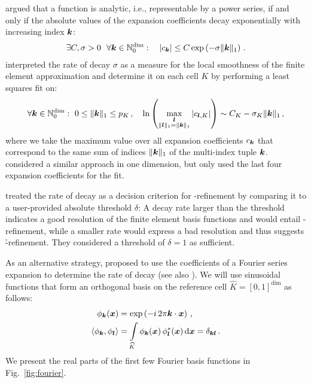 \textcite[Prop.~2]{eibner2007} argued that a function is analytic, i.e., representable by a power series, if and only if the absolute values of the expansion coefficients decay exponentially with increasing index $\tuple{k}$:
\begin{align}
\exists C,\sigma > 0 ~~ \forall \tuple{k} \in \mathbb{N}_0^\text{dim} : \quad |c_\tuple{k}| \leq C \exp\left( - \sigma \|\tuple{k}\|_1\right) \,\text{.}
\end{align}
\textcites[Sec.~2.4]{houston2005}[Ch.~4]{eibner2007} interpreted the rate of decay $\sigma$ as a measure for the local smoothness of the finite element approximation and determine it on each cell $K$ by performing a least squares fit on:
\begin{align}
\forall \tuple{k} \in \mathbb{N}_0^\text{dim} : ~ 0 \leq \|\tuple{k}\|_1 \leq p_K \,\text{,} \quad \ln \left( \max\limits_{\substack{\tuple{l} \\ \|\tuple{l}\|_1 = \|\tuple{k}\|_1}} |c_{\tuple{l},K}| \right) \sim C_K - \sigma_K \|\tuple{k}\|_1 \,\text{,}
\end{align}
where we take the maximum value over all expansion coefficients $c_\tuple{k}$ that correspond to the same sum of indices $\|\tuple{k}\|_1$ of the multi-index tuple $\tuple{k}$. \textcite{mavriplis1994} considered a similar approach in one dimension, but only used the last four expansion coefficients for the fit.

\textcite{mavriplis1994, eibner2007} treated the rate of decay as a decision criterion for \hp-refinement by comparing it to a user-provided absolute threshold $\delta$: A decay rate larger than the threshold indicates a good resolution of the finite element basis functions and would entail \p-refinement, while a smaller rate would express a bad resolution and thus suggests \h-refinement. They considered a threshold of $\delta = 1$ as sufficient.

As an alternative strategy, \textcite{bangerth2009} proposed to use the coefficients of a Fourier series expansion to determine the rate of decay (see also \textcite{dealiistep-27}). We will use sinusoidal functions that form an orthogonal basis on the reference cell $\widehat{K} = [0,1]^\text{dim}$ as follows:
\begin{align}
\phi_\tuple{k}(\vec{x}) &= \exp\left(- i \, 2\pi \tuple{k} \cdot \vec{x}\right) \,\text{,} \\
\langle \phi_\tuple{k}, \phi_\tuple{l} \rangle &= \int\limits_{\widehat{K}} \phi_\tuple{k}(\vec{x}) \, \phi_\tuple{l}^\ast(\vec{x}) \differential{\vec{x}} = \delta_{\tuple{k} \tuple{l}} \,\text{.}
\end{align}
We present the real parts of the first few Fourier basis functions in Fig.~\ref{fig:fourier}.

